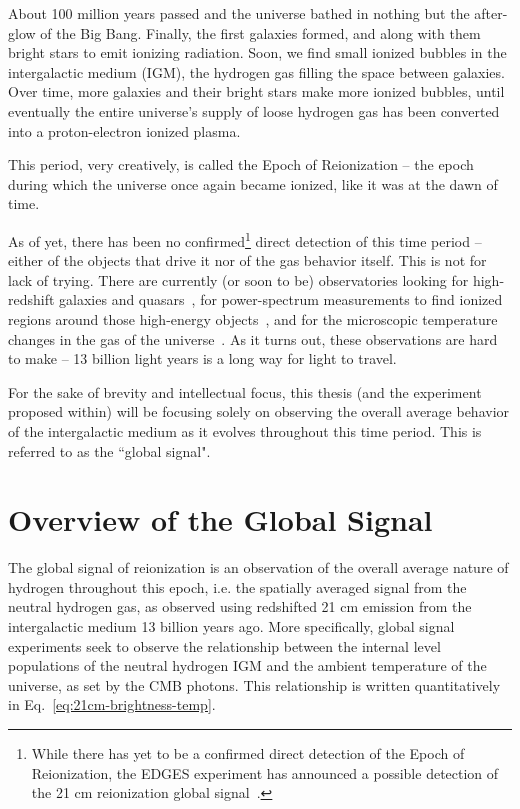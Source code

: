 About 100 million years passed and the universe bathed in nothing but the 
after-glow of the Big Bang. Finally, the first galaxies formed, and along with 
them bright stars to emit ionizing radiation. Soon, we find small ionized 
bubbles in the intergalactic medium (IGM), the hydrogen gas filling the space 
between galaxies. Over time, more galaxies and their bright stars make more 
ionized bubbles, until eventually the entire universe's supply of loose 
hydrogen gas has been converted into a proton-electron ionized plasma.

This period, very creatively, is called the Epoch of Reionization -- the epoch 
during which the universe once again became ionized, like it was at the dawn of 
time.

As of yet, there has been no confirmed\footnote{While there has yet to be a 
confirmed direct detection of the Epoch of Reionization, the EDGES experiment 
has announced a possible detection of the 21 cm reionization global 
signal~\citep{bowman2018}.} direct detection of this time period -- either of 
the objects that drive it nor of the gas behavior itself.  This is not for lack 
of trying.  There are currently (or soon to be) observatories looking for 
high-redshift galaxies and quasars~\citep{gardner2006}, for power-spectrum 
measurements to find ionized regions around those high-energy 
objects~\citep{deboer2017}, and for the microscopic temperature changes in the 
gas of the universe~\citep{bowman2010}.  As it turns out, these observations 
are hard to make -- 13 billion light years is a long way for light to travel.

For the sake of brevity and intellectual focus, this thesis (and the experiment 
proposed within) will be focusing solely on observing the overall average 
behavior of the intergalactic medium as it evolves throughout this time period.  
This is referred to as the ``global signal".

\section{Overview of the Global Signal}
\label{sec:global-signal-overview}

The global signal of reionization is an observation of the overall average 
nature of hydrogen throughout this epoch, i.e. the spatially averaged signal 
from the neutral hydrogen gas, as observed using redshifted 21 cm emission from 
the intergalactic medium 13 billion years ago. More specifically, global signal 
experiments seek to observe the relationship between the internal level 
populations of the neutral hydrogen IGM and the ambient temperature of the 
universe, as set by the CMB photons.  This relationship is written 
quantitatively in Eq.~\eqref{eq:21cm-brightness-temp}.

